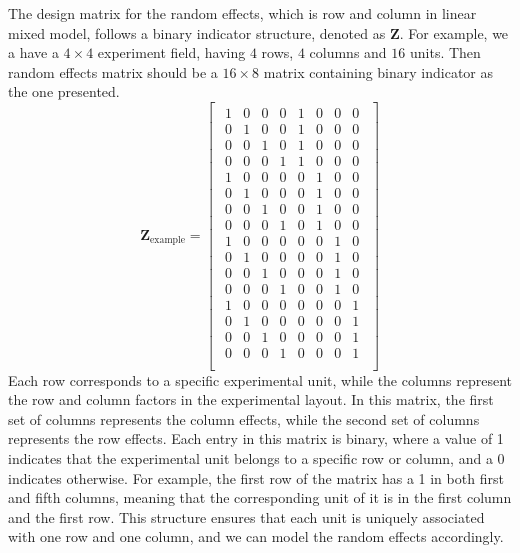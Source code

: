 \documentclass[
  a4paper,
  oneside,
  openany,
  12pt,
  onecolumn]{book}
\theoremstyle{definition}
\theoremstyle{definition}
\theoremstyle{plain}
\theoremstyle{remark}
\begin{document}
The design matrix for the random effects, which is row and column in
linear mixed model, follows a binary indicator structure, denoted as
\(\boldsymbol{Z}\). For example, we a have a \(4\times 4\) experiment
field, having \(4\) rows, \(4\) columns and \(16\) units. Then random
effects matrix should be a \(16 \times 8\) matrix containing binary
indicator as the one presented. \[
\boldsymbol{Z}_{\text{example}}=
\begin{bmatrix}
\begin{array}{cccc|cccc}
1 & 0 & 0 & 0 & 1 & 0 & 0 & 0 \\
0 & 1 & 0 & 0 & 1 & 0 & 0 & 0 \\
0 & 0 & 1 & 0 & 1 & 0 & 0 & 0 \\
0 & 0 & 0 & 1 & 1 & 0 & 0 & 0 \\
1 & 0 & 0 & 0 & 0 & 1 & 0 & 0 \\
0 & 1 & 0 & 0 & 0 & 1 & 0 & 0 \\
0 & 0 & 1 & 0 & 0 & 1 & 0 & 0 \\
0 & 0 & 0 & 1 & 0 & 1 & 0 & 0 \\
1 & 0 & 0 & 0 & 0 & 0 & 1 & 0 \\
0 & 1 & 0 & 0 & 0 & 0 & 1 & 0 \\
0 & 0 & 1 & 0 & 0 & 0 & 1 & 0 \\
0 & 0 & 0 & 1 & 0 & 0 & 1 & 0 \\
1 & 0 & 0 & 0 & 0 & 0 & 0 & 1 \\
0 & 1 & 0 & 0 & 0 & 0 & 0 & 1 \\
0 & 0 & 1 & 0 & 0 & 0 & 0 & 1 \\
0 & 0 & 0 & 1 & 0 & 0 & 0 & 1 \\
\end{array}
\end{bmatrix}
\] Each row corresponds to a specific experimental unit, while the
columns represent the row and column factors in the experimental layout.
In this matrix, the first set of columns represents the column effects,
while the second set of columns represents the row effects. Each entry
in this matrix is binary, where a value of 1 indicates that the
experimental unit belongs to a specific row or column, and a 0 indicates
otherwise. For example, the first row of the matrix has a 1 in both
first and fifth columns, meaning that the corresponding unit of it is in
the first column and the first row. This structure ensures that each
unit is uniquely associated with one row and one column, and we can
model the random effects accordingly.
\end{document}
